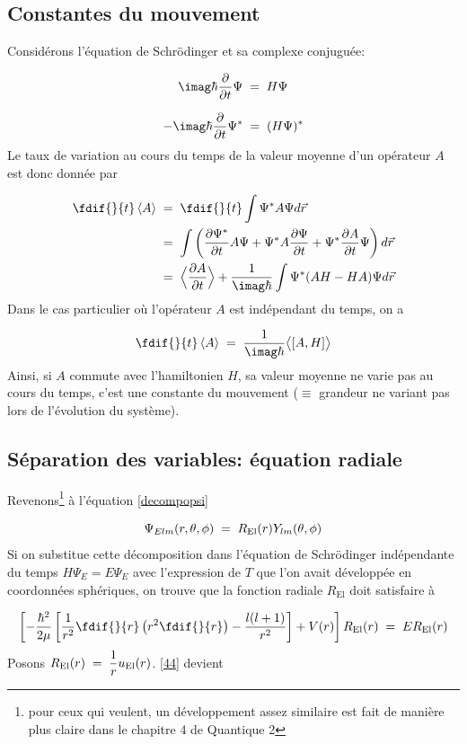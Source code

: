 \subsection{Constantes du mouvement}
Considérons l'équation de Schrödinger et sa complexe conjuguée:

\[
    \imag \hbar \dfrac{\partial}{\partial t} \Psi \eq H \Psi 
\]

\[
    -\imag \hbar \dfrac{\partial}{\partial t} \Psi ^{*}\eq (H \Psi)^{*} 
\]
Le taux de variation au cours du temps de la valeur moyenne d'un opérateur $A$ est donc donnée par

\begin{align*}
    \fdif{}{t}  \left<A\right>&\eq\fdif{}{t} \int \Psi^{*} A \Psi d\Vec{r} \\
    &\eq \int\left(\dfrac{\partial\Psi^{*}}{\partial t}A \Psi + \Psi^{*} A \dfrac{\partial \Psi }{\partial t } + \Psi^{*} \dfrac{\partial A}{\partial t}\Psi \right) d\Vec{r}\\
    &\eq \Big< \dfrac{\partial A}{\partial t} \Big> +\dfrac{1}{\imag \hbar} \int \Psi^{*} (AH-HA)\Psi d\Vec{r}
\end{align*}
Dans le cas particulier où l'opérateur $A$ est indépendant du temps, on a 


\[
  \fdif{}{t}\left<A\right>\eq \dfrac{1}{\imag\hbar}\big<[A,H]\big>  
\]
Ainsi, si $A$ commute avec l'hamiltonien $H$, sa valeur moyenne ne varie pas au cours du temps, c'est une constante du mouvement ($\equiv$ grandeur ne variant pas lors de l'évolution du système). 


\subsection{Séparation des variables: équation radiale} 
Revenons\footnote{pour ceux qui veulent, un développement assez similaire est fait de 
manière plus claire dans le chapitre 4 de Quantique 2} à l'équation \eqref{decompopsi}

\[
    \Psi_{Elm}(r, \theta, \phi)\; = \; R_\text{El}(r)Y_{lm}(\theta, \phi)
\]
Si on substitue cette décomposition dans l'équation de Schrödinger indépendante du temps $H\Psi_E=E\Psi_E$ avec l'expression de $T$ que l'on avait développée en coordonnées sphériques, on trouve que la fonction radiale $R_\text{El}$ doit satisfaire à

\begin{equation}
    \left[-\dfrac{\hbar^2}{2\mu}\left[\dfrac{1}{r^2}\fdif{}{r}\left(r^2\fdif{}{r}\right) - \dfrac{l(l+1)}{r^2}\right]+V(r)\right]R_\text{El}(r)\eq ER_\text{El}(r)
    \label{44}
\end{equation}
Posons $R_\text{El}(r)\; = \; \dfrac{1}{r}u_\text{El}(r)$. \eqref{44} devient

